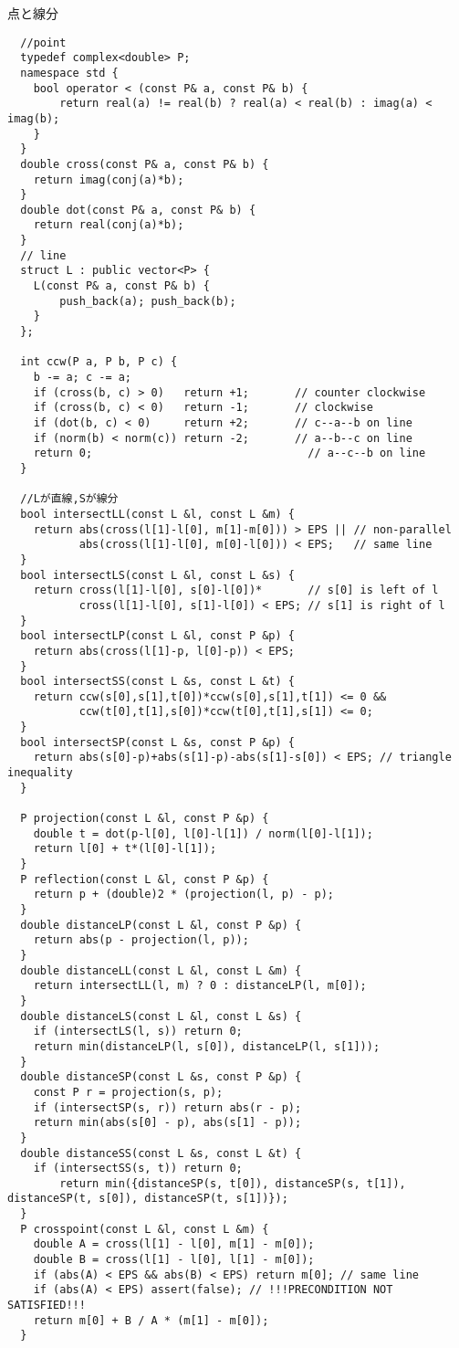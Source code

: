 \documentclass[11pt,a4paper]{jsarticle}
\begin{document}
点と線分
\begin{lstlisting}
  //point
  typedef complex<double> P;
  namespace std {
  	bool operator < (const P& a, const P& b) {
  		return real(a) != real(b) ? real(a) < real(b) : imag(a) < imag(b);
  	}
  }
  double cross(const P& a, const P& b) {
  	return imag(conj(a)*b);
  }
  double dot(const P& a, const P& b) {
  	return real(conj(a)*b);
  }
  // line
  struct L : public vector<P> {
  	L(const P& a, const P& b) {
  		push_back(a); push_back(b);
  	}
  };

  int ccw(P a, P b, P c) {
    b -= a; c -= a;
    if (cross(b, c) > 0)   return +1;       // counter clockwise
    if (cross(b, c) < 0)   return -1;       // clockwise
    if (dot(b, c) < 0)     return +2;       // c--a--b on line
    if (norm(b) < norm(c)) return -2;       // a--b--c on line
    return 0;								  // a--c--b on line
  }

  //Lが直線,Sが線分
  bool intersectLL(const L &l, const L &m) {
    return abs(cross(l[1]-l[0], m[1]-m[0])) > EPS || // non-parallel
           abs(cross(l[1]-l[0], m[0]-l[0])) < EPS;   // same line
  }
  bool intersectLS(const L &l, const L &s) {
    return cross(l[1]-l[0], s[0]-l[0])*       // s[0] is left of l
           cross(l[1]-l[0], s[1]-l[0]) < EPS; // s[1] is right of l
  }
  bool intersectLP(const L &l, const P &p) {
    return abs(cross(l[1]-p, l[0]-p)) < EPS;
  }
  bool intersectSS(const L &s, const L &t) {
    return ccw(s[0],s[1],t[0])*ccw(s[0],s[1],t[1]) <= 0 &&
           ccw(t[0],t[1],s[0])*ccw(t[0],t[1],s[1]) <= 0;
  }
  bool intersectSP(const L &s, const P &p) {
    return abs(s[0]-p)+abs(s[1]-p)-abs(s[1]-s[0]) < EPS; // triangle inequality
  }

  P projection(const L &l, const P &p) {
  	double t = dot(p-l[0], l[0]-l[1]) / norm(l[0]-l[1]);
  	return l[0] + t*(l[0]-l[1]);
  }
  P reflection(const L &l, const P &p) {
  	return p + (double)2 * (projection(l, p) - p);
  }
  double distanceLP(const L &l, const P &p) {
  	return abs(p - projection(l, p));
  }
  double distanceLL(const L &l, const L &m) {
  	return intersectLL(l, m) ? 0 : distanceLP(l, m[0]);
  }
  double distanceLS(const L &l, const L &s) {
  	if (intersectLS(l, s)) return 0;
  	return min(distanceLP(l, s[0]), distanceLP(l, s[1]));
  }
  double distanceSP(const L &s, const P &p) {
  	const P r = projection(s, p);
  	if (intersectSP(s, r)) return abs(r - p);
  	return min(abs(s[0] - p), abs(s[1] - p));
  }
  double distanceSS(const L &s, const L &t) {
  	if (intersectSS(s, t)) return 0;
  		return min({distanceSP(s, t[0]), distanceSP(s, t[1]), distanceSP(t, s[0]), distanceSP(t, s[1])});
  }
  P crosspoint(const L &l, const L &m) {
    double A = cross(l[1] - l[0], m[1] - m[0]);
    double B = cross(l[1] - l[0], l[1] - m[0]);
    if (abs(A) < EPS && abs(B) < EPS) return m[0]; // same line
    if (abs(A) < EPS) assert(false); // !!!PRECONDITION NOT SATISFIED!!!
    return m[0] + B / A * (m[1] - m[0]);
  }
\end{lstlisting}
\end{document}
